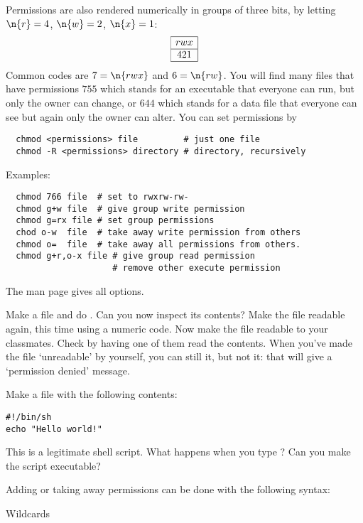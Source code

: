 Permissions are also rendered
numerically in groups of three bits, by letting $\n{r}=4$, $\n{w}=2$,
$\n{x}=1$:
\[ \begin{array}{|c|}
  \hline rwx\\ \hline 421 \\ \hline
\end{array}
\]
Common codes are $7=\n{rwx}$ and $6=\n{rw}$. You will find
many files that have permissions $755$ which stands for an executable
that everyone can run, but only the owner can change, or $644$ which
stands for a data file that everyone can see but again only the owner
can alter. You can set permissions by 
\begin{verbatim}
  chmod <permissions> file         # just one file
  chmod -R <permissions> directory # directory, recursively
\end{verbatim}
Examples:
\begin{verbatim}
  chmod 766 file  # set to rwxrw-rw-
  chmod g+w file  # give group write permission
  chmod g=rx file # set group permissions
  chod o-w  file  # take away write permission from others
  chmod o=  file  # take away all permissions from others.
  chmod g+r,o-x file # give group read permission
                     # remove other execute permission
\end{verbatim}
The man page gives all options.

\practical
{Make a file  and do . Can you now inspect its
contents? Make the file readable again, this time using a numeric
code. Now make the file readable to your classmates. Check by having
one of them read the contents.}
{When you've made the file `unreadable'
  by yourself, you can still  it, but not  it: that will
  give a `permission denied' message.}{}

Make a file  with the following contents:
\begin{verbatim}
#!/bin/sh
echo "Hello world!"
\end{verbatim}
This is a legitimate shell script. What happens when you type
? Can you make the script executable?

Adding or taking away permissions can be done with the following
syntax:

 {Wildcards}
\label{sec:shell-wildcard}

